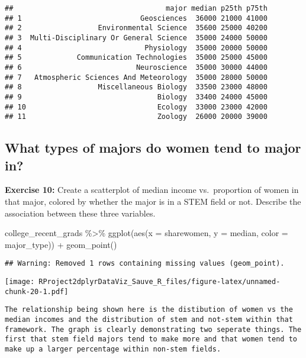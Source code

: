 \documentclass[
]{article}
\newenvironment{Shaded}{\begin{snugshade}}{\end{snugshade}}
\newcommand{\AttributeTok}[1]{\textcolor[rgb]{0.77,0.63,0.00}{#1}}
\newcommand{\FunctionTok}[1]{\textcolor[rgb]{0.00,0.00,0.00}{#1}}
\newcommand{\NormalTok}[1]{#1}
\newcommand{\SpecialCharTok}[1]{\textcolor[rgb]{0.00,0.00,0.00}{#1}}
\begin{document}
\begin{verbatim}
##                                    major median p25th p75th
## 1                            Geosciences  36000 21000 41000
## 2                  Environmental Science  35600 25000 40200
## 3  Multi-Disciplinary Or General Science  35000 24000 50000
## 4                             Physiology  35000 20000 50000
## 5             Communication Technologies  35000 25000 45000
## 6                           Neuroscience  35000 30000 44000
## 7   Atmospheric Sciences And Meteorology  35000 28000 50000
## 8                  Miscellaneous Biology  33500 23000 48000
## 9                                Biology  33400 24000 45000
## 10                               Ecology  33000 23000 42000
## 11                               Zoology  26000 20000 39000
\end{verbatim}

\hypertarget{what-types-of-majors-do-women-tend-to-major-in}{%
\subsection{What types of majors do women tend to major
in?}\label{what-types-of-majors-do-women-tend-to-major-in}}

\textbf{Exercise 10:} Create a scatterplot of median income
vs.~proportion of women in that major, colored by whether the major is
in a STEM field or not. Describe the association between these three
variables.

\begin{Shaded}
\begin{Highlighting}[]
\NormalTok{college\_recent\_grads }\SpecialCharTok{\%\textgreater{}\%}
  \FunctionTok{ggplot}\NormalTok{(}\FunctionTok{aes}\NormalTok{(}\AttributeTok{x =}\NormalTok{ sharewomen, }\AttributeTok{y =}\NormalTok{ median, }\AttributeTok{color =}\NormalTok{ major\_type)) }\SpecialCharTok{+} \FunctionTok{geom\_point}\NormalTok{()}
\end{Highlighting}
\end{Shaded}

\begin{verbatim}
## Warning: Removed 1 rows containing missing values (geom_point).
\end{verbatim}

\texttt{[image: RProject2dplyrDataViz\_Sauve\_R\_files/figure-latex/unnamed-chunk-20-1.pdf]}

\begin{verbatim}
The relationship being shown here is the distibution of women vs the median incomes and the distribution of stem and not-stem within that framework. The graph is clearly demonstrating two seperate things. The first that stem field majors tend to make more and that women tend to make up a larger percentage within non-stem fields.
\end{verbatim}
\end{document}
